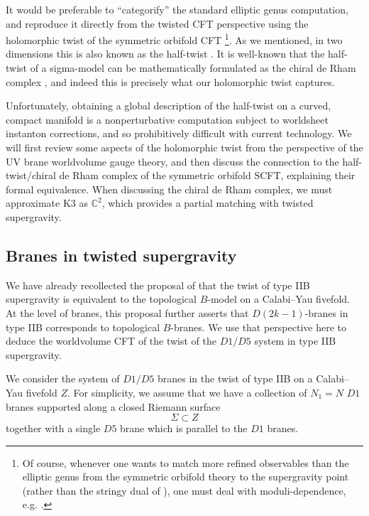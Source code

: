 \documentclass[../main.tex]{subfiles}
\begin{document}
It would be preferable to ``categorify'' the standard elliptic genus computation, and reproduce it directly from the twisted CFT perspective using the holomorphic twist of the symmetric orbifold CFT \footnote{Of course, whenever one wants to match more refined observables than the elliptic genus from the symmetric orbifold theory to the supergravity point (rather than the stringy dual of \cite{Eberhardt:2018ouy}), one must deal with moduli-dependence, e.g. \cite{Taylor:2007hs} .}.  As we mentioned, in two dimensions this is also known as the half-twist \cite{Witten, Kapustin}. It is well-known that the half-twist of a sigma-model can be mathematically formulated as the chiral de Rham complex \cite{Kapustin, Malikovetal, Tan}, and indeed this is precisely what our holomorphic twist captures. 

Unfortunately, obtaining a global description of the half-twist on a curved, compact manifold is a nonperturbative computation subject to worldsheet instanton corrections, and so prohibitively difficult with current technology. We will first review some aspects of the holomorphic twist from the perspective of the UV brane worldvolume gauge theory, and then discuss the connection to the half-twist/chiral de Rham complex of the symmetric orbifold SCFT, explaining their formal equivalence. When discussing the chiral de Rham complex, we must approximate K3 as $\mathbb{C}^2$, which provides a partial matching with twisted supergravity.  
 

\subsection{Branes in twisted supergravity}

We have already recollected the proposal of \cite{CLsugra} that the twist of type IIB supergravity is equivalent to the topological $B$-model on a Calabi--Yau fivefold.
At the level of branes, this proposal further asserts that $D(2k-1)$-branes in type IIB corresponds to topological $B$-branes.
We use that perspective here to deduce the worldvolume CFT of the twist of the $D1/D5$ system in type IIB supergravity.

We consider the system of $D1/D5$ branes in the twist of type IIB on a Calabi--Yau fivefold $Z$. 
For simplicity, we assume that we have a collection of $N_1 = N$ $D1$ branes supported along a closed Riemann surface
\[
\Sigma \subset Z \]
together with a single $D5$ brane which is parallel to the $D1$ branes. 
\end{document}
